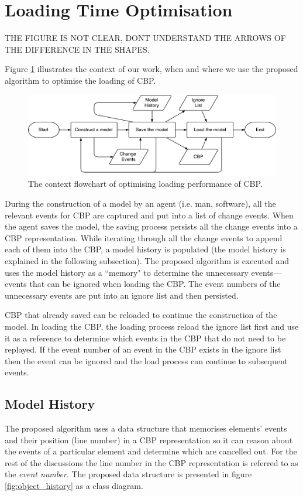\documentclass{llncs}
\begin{document}
\section{Loading Time Optimisation}

THE FIGURE IS NOT CLEAR, DONT UNDERSTAND THE ARROWS OF THE DIFFERENCE IN THE SHAPES.

\label{sec:loading_time_optimisation}
Figure \ref{fig:flowchart} illustrates the context of our work, when and where we use the proposed algorithm to optimise the loading of CBP. 

\begin{figure}[ht]
\centering
\includegraphics[width=\linewidth]{flowchart}
\caption{The context flowchart of optimising loading performance of CBP.}
\label{fig:flowchart}
\end{figure}

During the construction of a model by an agent (i.e. man, software), all the relevant events for CBP are captured and put into a list of change events. When the agent saves the model, the saving process persists all the change events into a CBP representation. While iterating through all the change events to append each of them into the CBP, a model history is populated (the model history is explained in the following subsection). The proposed algorithm is executed and uses the model history as a ``memory" to determine the unnecessary events---events that can be ignored when loading the CBP. The event numbers of the unnecessary events are put into an ignore list and then persisted. 

CBP that already saved can be reloaded to continue the construction of the model. In loading the CBP, the loading process reload the ignore list first and use it as a reference to determine which events in the CBP that do not need to be replayed. If the event number of an event in the CBP exists in the ignore list then the event can be ignored and the load process can continue to subsequent events. 

\subsection{Model History}
The proposed algorithm uses a data structure that memorises elements' events and their position (line number) in a CBP representation so it can reason about the events of a particular element and determine which are cancelled out.
For the rest of the discussions the line number in the CBP representation is referred to as the \emph{event number}. The proposed data structure is presented in figure \ref{fig:object_history} as a class diagram.  
\end{document}
